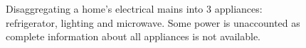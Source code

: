 \documentclass[conference]{IEEEtran}
\newcommand{\tabref}[1]{Table~\ref{#1}}
\begin{document}
\begin{figure} 
	
  	\caption{Disaggregating a home's electrical mains into 3 appliances: refrigerator, lighting and microwave. Some power is unaccounted as complete information about all appliances is not available.}
    \label{fig:disagg}
\end{figure}
\end{document}
